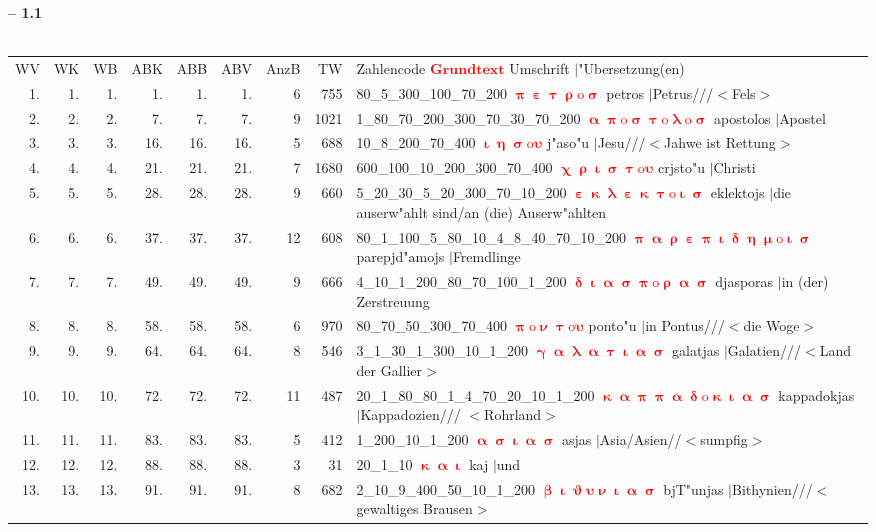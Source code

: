 \documentclass[a4paper,10pt,landscape]{article}
\begin{document}
\newpage 
{\bf -- 1.1}\\
\medskip \\
\begin{tabular}{rrrrrrrrp{120mm}}
WV&WK&WB&ABK&ABB&ABV&AnzB&TW&Zahlencode \textcolor{red}{$\boldsymbol{Grundtext}$} Umschrift $|$"Ubersetzung(en)\\
1.&1.&1.&1.&1.&1.&6&755&80\_5\_300\_100\_70\_200 \textcolor{red}{$\boldsymbol{\uppi\upepsilon\uptau\uprho\mathrm{o}\upsigma}$} petros $|$Petrus///$<$Fels$>$\\
2.&2.&2.&7.&7.&7.&9&1021&1\_80\_70\_200\_300\_70\_30\_70\_200 \textcolor{red}{$\boldsymbol{\upalpha\uppi\mathrm{o}\upsigma\uptau\mathrm{o}\uplambda\mathrm{o}\upsigma}$} apostolos $|$Apostel\\
3.&3.&3.&16.&16.&16.&5&688&10\_8\_200\_70\_400 \textcolor{red}{$\boldsymbol{\upiota\upeta\upsigma\mathrm{o}\upsilon}$} j"aso"u $|$Jesu///$<$Jahwe ist Rettung$>$\\
4.&4.&4.&21.&21.&21.&7&1680&600\_100\_10\_200\_300\_70\_400 \textcolor{red}{$\boldsymbol{\upchi\uprho\upiota\upsigma\uptau\mathrm{o}\upsilon}$} crjsto"u $|$Christi\\
5.&5.&5.&28.&28.&28.&9&660&5\_20\_30\_5\_20\_300\_70\_10\_200 \textcolor{red}{$\boldsymbol{\upepsilon\upkappa\uplambda\upepsilon\upkappa\uptau\mathrm{o}\upiota\upsigma}$} eklektojs $|$die auserw"ahlt sind/an (die) Auserw"ahlten\\
6.&6.&6.&37.&37.&37.&12&608&80\_1\_100\_5\_80\_10\_4\_8\_40\_70\_10\_200 \textcolor{red}{$\boldsymbol{\uppi\upalpha\uprho\upepsilon\uppi\upiota\updelta\upeta\upmu\mathrm{o}\upiota\upsigma}$} parepjd"amojs $|$Fremdlinge\\
7.&7.&7.&49.&49.&49.&9&666&4\_10\_1\_200\_80\_70\_100\_1\_200 \textcolor{red}{$\boldsymbol{\updelta\upiota\upalpha\upsigma\uppi\mathrm{o}\uprho\upalpha\upsigma}$} djasporas $|$in (der) Zerstreuung\\
8.&8.&8.&58.&58.&58.&6&970&80\_70\_50\_300\_70\_400 \textcolor{red}{$\boldsymbol{\uppi\mathrm{o}\upnu\uptau\mathrm{o}\upsilon}$} ponto"u $|$in Pontus///$<$die Woge$>$\\
9.&9.&9.&64.&64.&64.&8&546&3\_1\_30\_1\_300\_10\_1\_200 \textcolor{red}{$\boldsymbol{\upgamma\upalpha\uplambda\upalpha\uptau\upiota\upalpha\upsigma}$} galatjas $|$Galatien///$<$Land der Gallier$>$\\
10.&10.&10.&72.&72.&72.&11&487&20\_1\_80\_80\_1\_4\_70\_20\_10\_1\_200 \textcolor{red}{$\boldsymbol{\upkappa\upalpha\uppi\uppi\upalpha\updelta\mathrm{o}\upkappa\upiota\upalpha\upsigma}$} kappadokjas $|$Kappadozien/// $<$Rohrland$>$\\
11.&11.&11.&83.&83.&83.&5&412&1\_200\_10\_1\_200 \textcolor{red}{$\boldsymbol{\upalpha\upsigma\upiota\upalpha\upsigma}$} asjas $|$Asia/Asien//$<$sumpfig$>$\\
12.&12.&12.&88.&88.&88.&3&31&20\_1\_10 \textcolor{red}{$\boldsymbol{\upkappa\upalpha\upiota}$} kaj $|$und\\
13.&13.&13.&91.&91.&91.&8&682&2\_10\_9\_400\_50\_10\_1\_200 \textcolor{red}{$\boldsymbol{\upbeta\upiota\upvartheta\upsilon\upnu\upiota\upalpha\upsigma}$} bjT"unjas $|$Bithynien///$<$gewaltiges Brausen$>$\\
\end{tabular}\medskip \\
\end{document}
